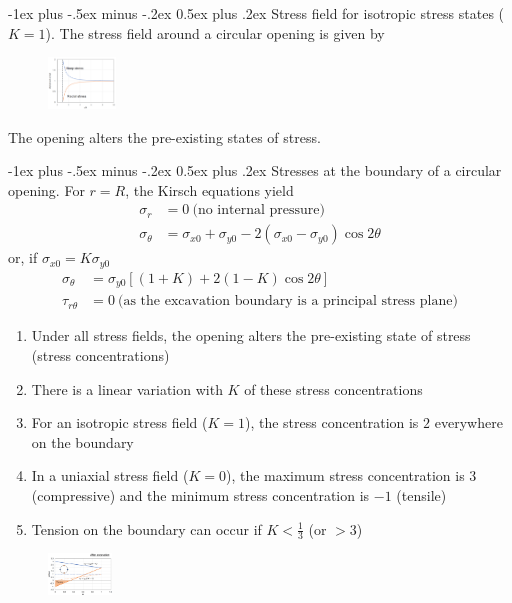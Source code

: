 \documentclass[10pt,landscape,a4paper]{article}
\makeatletter
\renewcommand{\section}{\@startsection{section}{1}{0mm}%
	{-1ex plus -.5ex minus -.2ex}%
	{0.5ex plus .2ex}%
	{\normalfont\large\bfseries}}
\makeatother
\begin{document}
\begin{multicols}{3}
		\section{Stress field for isotropic stress states ($K=1$).}
		The stress field around a circular opening is given by
			\begin{figure}[H]
				\centering
				\includegraphics[width=0.16\textwidth]{stress-field}
			\end{figure}
		The opening alters the pre-existing states of stress.
		
		\section{Stresses at the boundary of a circular opening.}
		For $r=R$, the Kirsch equations yield
			\begin{align*}
				\sigma_r &= 0 \ \text{(no internal pressure)}\\
				\sigma_\theta &= \sigma_{x0}+\sigma_{y0}-2(\sigma_{x0}-\sigma_{y0})\cos2\theta
			\end{align*}
		or, if $\sigma_{x0}=K\sigma_{y0}$
			\begin{align*}
				\sigma_\theta &= \sigma_{y0}\left[(1+K)+2(1-K)\cos2\theta\right]\\
				\tau_{r\theta} &= 0 \ \text{(as the excavation boundary is a principal stress plane)}
			\end{align*}
			\begin{enumerate}[label=(\alph*)]
				\item Under all stress fields, the opening alters the pre-existing state of stress (stress concentrations)
				\item There is a linear variation with $K$ of these stress concentrations
				\item For an isotropic stress field ($K=1$), the stress concentration is $2$ everywhere on the boundary
				\item In a uniaxial stress field ($K=0$), the maximum stress concentration is $3$ (compressive) and the minimum stress concentration is $-1$ (tensile)
				\item Tension on the boundary can occur if $K<\frac{1}{3}$ (or $>3$)
			\end{enumerate}
		\begin{figure}[H]
			\centering
			\includegraphics[width=0.15\textwidth]{stresses-boundary-circular-opening}
		\end{figure}
		

\end{multicols}
\end{document}
